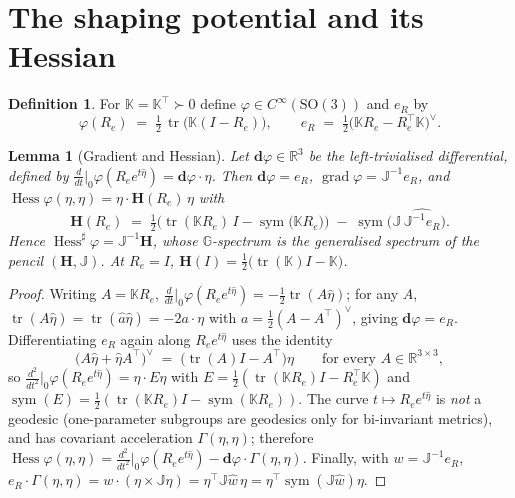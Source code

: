 \documentclass[11pt,a4paper]{article}
\newcommand{\Gm}{\mathbb{G}}
\newcommand{\Rm}{\mathbb{R}}
\newcommand{\Jm}{\mathbb{J}}
\newcommand{\Km}{\mathbb{K}}
\newcommand{\Hess}{\operatorname{Hess}}
\newcommand{\grad}{\operatorname{grad}}
\newcommand{\Cinf}[1]{C^{\infty}(#1)}
\newcommand{\sym}{\operatorname{sym}}
\newcommand{\SO}{\mathrm{SO}(3)}
\newcommand{\tr}{\operatorname{tr}}
\newcommand{\eR}{e_{R}}
\theoremstyle{plain}
\newtheorem{lemma}[theorem]{Lemma}
\theoremstyle{definition}
\newtheorem{definition}[theorem]{Definition}
\theoremstyle{remark}
\begin{document}
\section{The shaping potential and its Hessian}
\label{sec:so3-pot}

\begin{definition}
For $\Km = \Km^{\top}\succ0$ define $\varphi\in\Cinf{\SO}$ and $\eR$ by
\begin{equation}
  \varphi(R_e) \;=\; \tfrac12\,\tr\!\big(\Km(I - R_e)\big),
  \qquad
  \eR \;=\; \tfrac12\big(\Km R_e - R_e^{\top}\Km\big)^{\vee}.
\end{equation}
\end{definition}

\begin{lemma}[Gradient and Hessian]
\label{lem:hess}
Let $\mathbf{d}\varphi\in\Rm^3$ be the left-trivialised differential, defined by
$\tfrac{d}{dt}\big|_0\varphi(R_e e^{t\hat\eta}) = \mathbf{d}\varphi\cdot\eta$.
Then $\mathbf{d}\varphi = \eR$, $\grad\varphi = \Jm^{-1}\eR$, and
$\Hess\varphi(\eta,\eta) = \eta\cdot\mathbf{H}(R_e)\,\eta$ with
\begin{equation}
  \boxed{\;
  \mathbf{H}(R_e) \;=\; \tfrac12\Big(\tr(\Km R_e)\,I - \sym\!\big(\Km R_e\big)\Big)
   \;-\; \sym\!\Big(\Jm\,\widehat{\Jm^{-1}\eR}\Big) .
  \;}
  \label{eq:Hmat}
\end{equation}
Hence $\Hess^{\sharp}\varphi = \Jm^{-1}\mathbf{H}$, whose $\Gm$-spectrum is the
generalised spectrum of the pencil $(\mathbf{H},\Jm)$. At $R_e = I$,
$\mathbf{H}(I) = \tfrac12\big(\tr(\Km)I - \Km\big)$.
\end{lemma}

\begin{proof}
Writing $A = \Km R_e$, $\tfrac{d}{dt}\big|_0\varphi(R_ee^{t\hat\eta}) = -\tfrac12\tr(A\hat\eta)$;
for any $A$, $\tr(A\hat\eta) = \tr(\hat a\hat\eta) = -2a\cdot\eta$ with
$a=\tfrac12(A-A^{\top})^{\vee}$, giving $\mathbf{d}\varphi=\eR$. Differentiating
$\eR$ again along $R_ee^{t\hat\eta}$ uses the identity
\begin{equation}
  \big(A\hat\eta + \hat\eta A^{\top}\big)^{\vee} \;=\; \big(\tr(A)I - A^{\top}\big)\eta
  \qquad\text{for every }A\in\Rm^{3\times3},
  \label{eq:vee-id}
\end{equation}
so $\tfrac{d^2}{dt^2}\big|_0\varphi(R_ee^{t\hat\eta}) = \eta\cdot E\eta$ with
$E = \tfrac12(\tr(\Km R_e)I - R_e^{\top}\Km)$ and
$\sym(E) = \tfrac12(\tr(\Km R_e)I - \sym(\Km R_e))$. The curve
$t\mapsto R_ee^{t\hat\eta}$ is \emph{not} a geodesic (one-parameter subgroups are
geodesics only for bi-invariant metrics), and has covariant acceleration
$\Gamma(\eta,\eta)$; therefore
$\Hess\varphi(\eta,\eta) = \tfrac{d^2}{dt^2}\big|_0\varphi(R_ee^{t\hat\eta}) - \mathbf{d}\varphi\cdot\Gamma(\eta,\eta)$.
Finally, with $w=\Jm^{-1}\eR$,
$\eR\cdot\Gamma(\eta,\eta) = w\cdot(\eta\times\Jm\eta) = \eta^{\top}\Jm\hat w\,\eta
= \eta^{\top}\sym(\Jm\hat w)\eta$.
\end{proof}
\end{document}
